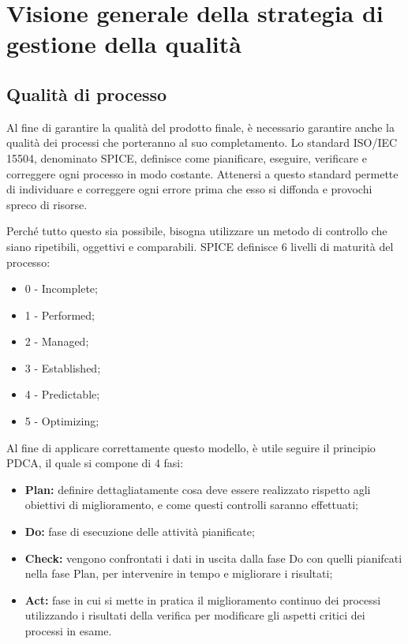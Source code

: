 \newpage
\section{Visione generale della strategia di gestione della qualità}

	\subsection{Qualità di processo}
	Al fine di garantire la qualità del prodotto finale, è necessario garantire anche la qualità dei processi che porteranno al suo completamento. Lo standard ISO/IEC 15504, denominato SPICE, definisce come pianificare, eseguire, verificare e correggere ogni processo in modo costante. 
	Attenersi a questo standard permette di individuare e correggere ogni errore prima che esso si diffonda e provochi spreco di risorse. 
	
	Perché tutto questo sia possibile, bisogna utilizzare un metodo di controllo che siano ripetibili, oggettivi e comparabili. SPICE definisce 6 livelli di maturità del processo:
	
	\begin{itemize}
		\item 0 - Incomplete;
		\item 1 - Performed;
		\item 2 - Managed;
		\item 3 - Established;
		\item 4 - Predictable;
		\item 5 - Optimizing;
	\end{itemize}
	
	Al fine di applicare correttamente questo modello, è utile seguire il principio PDCA, il quale si compone di 4 fasi:
	
	\begin{itemize}
		\item \textbf{Plan: }definire dettagliatamente cosa deve essere realizzato rispetto agli obiettivi di miglioramento, e come questi controlli saranno effettuati;
		\item \textbf{Do: }fase di esecuzione delle attività pianificate;
		\item \textbf{Check: }vengono confrontati i dati in uscita dalla fase Do con quelli pianifcati nella fase Plan, per intervenire in tempo e migliorare i risultati;
		\item \textbf{Act: }fase in cui si mette in pratica il miglioramento continuo dei processi utilizzando i risultati della verifica per modificare gli aspetti critici dei processi in esame.
	\end{itemize}

